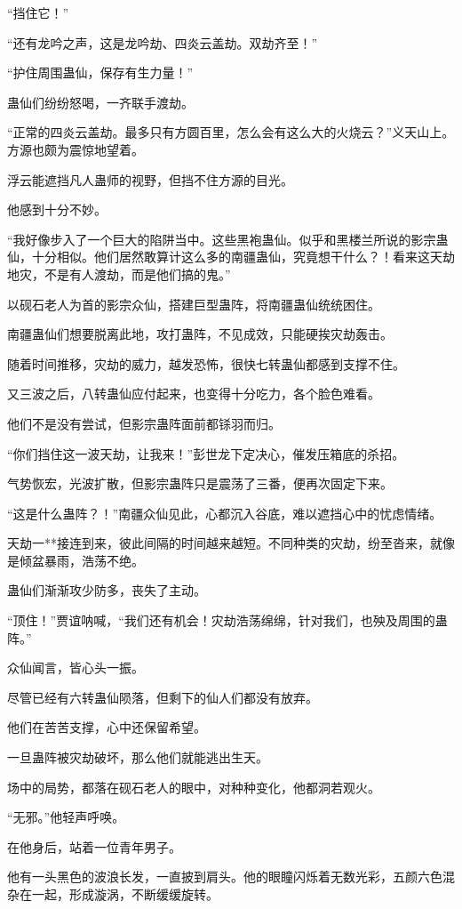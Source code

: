 \begin{this_body}
“挡住它！”

“还有龙吟之声，这是龙吟劫、四炎云盖劫。双劫齐至！”

“护住周围蛊仙，保存有生力量！”

蛊仙们纷纷怒喝，一齐联手渡劫。

“正常的四炎云盖劫。最多只有方圆百里，怎么会有这么大的火烧云？”义天山上。方源也颇为震惊地望着。

浮云能遮挡凡人蛊师的视野，但挡不住方源的目光。

他感到十分不妙。

“我好像步入了一个巨大的陷阱当中。这些黑袍蛊仙。似乎和黑楼兰所说的影宗蛊仙，十分相似。他们居然敢算计这么多的南疆蛊仙，究竟想干什么？！看来这天劫地灾，不是有人渡劫，而是他们搞的鬼。”

以砚石老人为首的影宗众仙，搭建巨型蛊阵，将南疆蛊仙统统困住。

南疆蛊仙们想要脱离此地，攻打蛊阵，不见成效，只能硬挨灾劫轰击。

随着时间推移，灾劫的威力，越发恐怖，很快七转蛊仙都感到支撑不住。

又三波之后，八转蛊仙应付起来，也变得十分吃力，各个脸色难看。

他们不是没有尝试，但影宗蛊阵面前都铩羽而归。

“你们挡住这一波天劫，让我来！”彭世龙下定决心，催发压箱底的杀招。

气势恢宏，光波扩散，但影宗蛊阵只是震荡了三番，便再次固定下来。

“这是什么蛊阵？！”南疆众仙见此，心都沉入谷底，难以遮挡心中的忧虑情绪。

天劫一**接连到来，彼此间隔的时间越来越短。不同种类的灾劫，纷至沓来，就像是倾盆暴雨，浩荡不绝。

蛊仙们渐渐攻少防多，丧失了主动。

“顶住！”贾谊呐喊，“我们还有机会！灾劫浩荡绵绵，针对我们，也殃及周围的蛊阵。”

众仙闻言，皆心头一振。

尽管已经有六转蛊仙陨落，但剩下的仙人们都没有放弃。

他们在苦苦支撑，心中还保留希望。

一旦蛊阵被灾劫破坏，那么他们就能逃出生天。

场中的局势，都落在砚石老人的眼中，对种种变化，他都洞若观火。

“无邪。”他轻声呼唤。

在他身后，站着一位青年男子。

他有一头黑色的波浪长发，一直披到肩头。他的眼瞳闪烁着无数光彩，五颜六色混杂在一起，形成漩涡，不断缓缓旋转。


\end{this_body}
